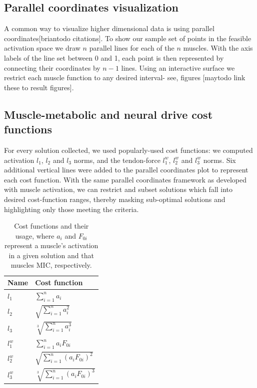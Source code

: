 \subsection{Parallel coordinates visualization}
A common way to visualize higher dimensional data is using parallel coordinates[briantodo citations]. To show our sample set of points in the feasible activation space we draw $n$ parallel lines for each of the $n$ muscles. With the axis labels of the line set between 0 and 1, each point is then represented by connecting their coordinates by $n-1$ lines. Using an interactive surface we restrict each muscle function to any desired interval- see, figures [maytodo link these to result figures].

\subsection{Muscle-metabolic and neural drive cost functions}

For every solution collected, we used popularly-used cost functions: we computed activation $l_1$, $l_2$ and $l_3$ norms, and the tendon-force $l_1^w$, $l_2^w$ and $l_3^w$ norms. Six additional vertical lines were added to the parallel coordinates plot to represent each cost function. With the same parallel coordinates framework as developed with muscle activation, we can restrict and subset solutions which fall into desired cost-function ranges, thereby masking sub-optimal solutions and highlighting only those meeting the criteria.

\begin{table}[h]
\centering
\begin{tabular}{@{}ll@{}}
\toprule
\textbf{Name} & \textbf{Cost function}  \\ \midrule
$l_1$            & $\sum_{i=1}^n a_i$                                     \\
$l_2$            & $\sqrt{\sum_{i=1}^n a_i^2}$                                    \\
$l_3$            & $\sqrt[3]{\sum_{i=1}^n a_i^3}$                                   \\
$l_1^w$            & $\sum_{i=1}^n a_i F_{0i}$                                    \\
$l_2^w$            & $\sqrt{\sum_{i=1}^n (a_i F_{0i})^2}$                                  \\
$l_3^w$            & $\sqrt[3]{\sum_{i=1}^n (a_i F_{0i})^3}$                                    \\ \bottomrule
\end{tabular}

\caption{Cost functions and their usage, where $a_i$ and $F_{0i}$ represent a muscle's activation in a given solution and that muscles MIC, respectively.}
\label{cost_function_tabls}

\end{table}

